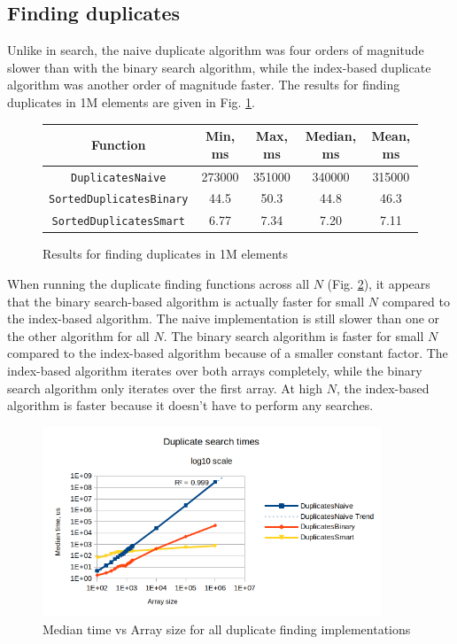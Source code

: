 \documentclass[a4paper,11pt]{article}
\begin{document}
    \subsection*{Finding duplicates}

    Unlike in search, the naive duplicate algorithm was four orders of magnitude slower than with the binary search algorithm, while the index-based duplicate algorithm was another order of magnitude faster. The results for finding duplicates in 1M elements are given in Fig. \ref{fig:dupes-n-1M}.

    \begin{figure}[H]
        \centering
        \begin{tabular}{c|c|c|c|c}
            Function & Min, ms & Max, ms & Median, ms & Mean, ms \\
            \hline
            \hline
            \texttt{DuplicatesNaive} & 273000 & 351000 & 340000 & 315000 \\
            \hline
            \texttt{SortedDuplicatesBinary} & 44.5 & 50.3 & 44.8 & 46.3 \\
            \hline
            \texttt{SortedDuplicatesSmart} & 6.77 & 7.34 & 7.20 & 7.11 \\
        \end{tabular}
        \caption{Results for finding duplicates in 1M elements}
        \label{fig:dupes-n-1M}
    \end{figure}

    When running the duplicate finding functions across all $N$ (Fig. \ref{fig:dupes-chart}), it appears that the binary search-based algorithm is actually faster for small $N$ compared to the index-based algorithm. The naive implementation is still slower than one or the other algorithm for all $N$. The binary search algorithm is faster for small $N$ compared to the index-based algorithm because of a smaller constant factor. The index-based algorithm iterates over both arrays completely, while the binary search algorithm only iterates over the first array. At high $N$, the index-based algorithm is faster because it doesn't have to perform any searches.

    \begin{figure}[H]
        \centering
        \includegraphics[width=0.9\textwidth]{dupes.png}
        \caption{Median time vs Array size for all duplicate finding implementations}
        \label{fig:dupes-chart}
    \end{figure}
\end{document}
